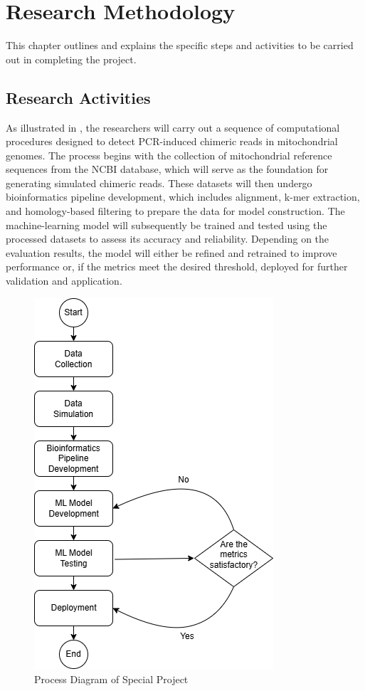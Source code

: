 \chapter{Research Methodology}

This chapter outlines and explains the specific steps and activities to be carried out in completing the project.

\section{Research Activities}

As illustrated in , the researchers will carry out a sequence of computational procedures designed to detect PCR-induced chimeric reads in mitochondrial genomes. The process begins with the collection of mitochondrial reference sequences from the NCBI database, which will serve as the foundation for generating simulated chimeric reads. These datasets will then undergo bioinformatics pipeline development, which includes alignment, k-mer extraction, and homology-based filtering to prepare the data for model construction. The machine-learning model will subsequently be trained and tested using the processed datasets to assess its accuracy and reliability. Depending on the evaluation results, the model will either be refined and retrained to improve performance or, if the metrics meet the desired threshold, deployed for further validation and application.

\begin{figure}[H]
  \centering
  \includegraphics[width=0.4\linewidth]{figures/research_activities.png}
  \caption{Process Diagram of Special Project}\label{fig:process_diagram}
\end{figure}

